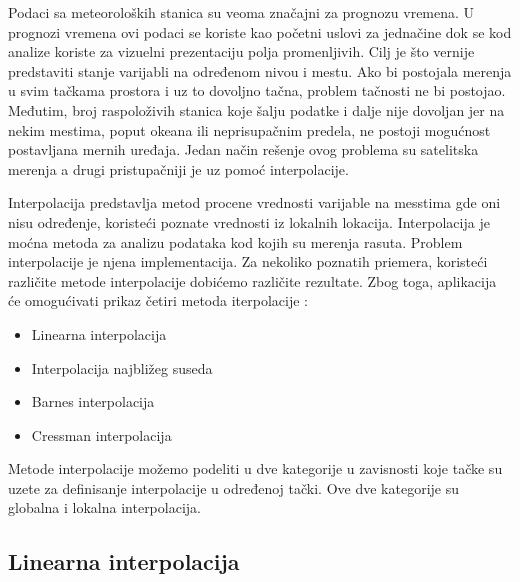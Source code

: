 \documentclass[12pt]{article}
\begin{document}
Podaci sa meteoroloških stanica su veoma značajni za prognozu vremena. U prognozi vremena ovi podaci se koriste kao početni uslovi za jednačine dok se kod analize koriste za vizuelni prezentaciju polja promenljivih. Cilj je što vernije predstaviti stanje varijabli na određenom nivou i mestu. Ako bi postojala merenja u svim tačkama prostora i uz to dovoljno tačna, problem tačnosti ne bi postojao. Međutim, broj raspoloživih stanica koje šalju podatke i dalje nije dovoljan jer na nekim mestima, poput okeana ili neprisupačnim predela, ne postoji mogućnost postavljana mernih uređaja. Jedan način rešenje ovog problema su satelitska merenja a drugi pristupačniji je uz pomoć interpolacije.

Interpolacija predstavlja metod procene vrednosti varijable na messtima gde oni nisu određenje, koristeći poznate vrednosti iz lokalnih lokacija. Interpolacija je moćna metoda za analizu podataka kod kojih su merenja rasuta. Problem interpolacije je njena implementacija. Za nekoliko poznatih priemera, koristeći različite metode interpolacije dobićemo različite rezultate. Zbog toga, aplikacija će omogućivati prikaz četiri metoda iterpolacije :
\begin{itemize}
\item Linearna interpolacija
\item Interpolacija najbližeg suseda
\item Barnes interpolacija
\item Cressman interpolacija
\end{itemize}
Metode interpolacije možemo podeliti u dve kategorije u zavisnosti koje tačke su uzete za definisanje interpolacije u određenoj tački. Ove dve kategorije su globalna i lokalna interpolacija.
\subsection{Linearna interpolacija}
\end{document}

